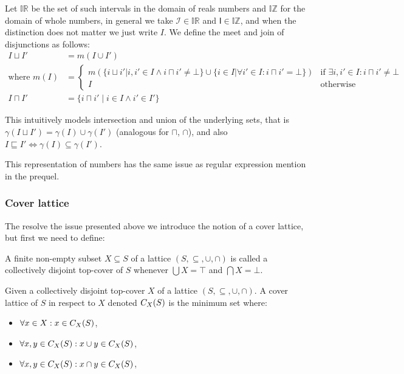 Let $\mathbb{IR}$ be the set of such intervals in the domain of reals numbers and $\mathbb{IZ}$ for the domain of whole numbers, in general we take $\mathscr{I} \in \mathbb{IR}$ and $\mathsf{I} \in \mathbb{IZ}$, and when the distinction does not matter we just write $I$.
We define the meet and join of disjunctions as follows:
\begin{align}
    I \sqcup I' &= m(I \cup I') \\
    \text{where } m(I) &= \begin{cases}
        m(\{ i \sqcup i' | i, i' \in I \land i \sqcap i' \neq \bot \} \cup \{ i \in I | \forall i' \in I : i \sqcap i' = \bot \}) & \text{if } \exists i, i' \in I: i \sqcap i' \neq \bot \\
        I & \text{otherwise}
    \end{cases} \\
    I \sqcap I' &= \{i \sqcap i' \mid i \in I \land i' \in I'\}
\end{align}

This intuitively models intersection and union of the underlying sets, that is $\gamma(I \sqcup I') = \gamma(I) \cup \gamma(I')$ (analogous for $\sqcap$, $\cap$), and also $I \sqsubseteq I' \iff \gamma(I) \subseteq \gamma(I')$.

This representation of numbers has the same issue as regular expression mention in the prequel.

\subsubsection{Cover lattice}

The resolve the issue presented above we introduce the notion of a cover lattice, but first we need to define:

\begin{definition}
    A finite non-empty subset $X \subseteq S$ of a lattice $(S, \subseteq, \cup, \cap)$ is called a collectively disjoint top-cover of $S$ whenever $\bigcup X = \top$ and $\bigcap X = \bot$.
\end{definition}

\begin{definition}\label{def:coverlattice}
    Given a collectively disjoint top-cover $X$ of a lattice $(S, \subseteq, \cup, \cap)$.
    A cover lattice of $S$ in respect to $X$ denoted $C_{X}(S)$ is the minimum set where:
    \begin{itemize}
        \item $\forall x \in X: x \in C_{X}(S)$,
        \item $\forall x, y \in C_{X}(S) : x \cup y \in C_{X}(S)$,
        \item $\forall x, y \in C_{X}(S) : x \cap y \in C_{X}(S)$,
    \end{itemize}
\end{definition}

